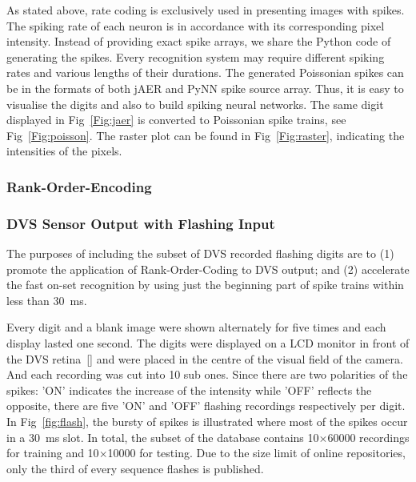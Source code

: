 	As stated above, rate coding is exclusively used in presenting images with spikes.
	The spiking rate of each neuron is in accordance with its corresponding pixel intensity.
	Instead of providing exact spike arrays, we share the Python code of generating the spikes.
	Every recognition system may require different spiking rates and various lengths of their durations.
	The generated Poissonian spikes can be in the formats of both jAER and PyNN spike source array.
	Thus, it is easy to visualise the digits and also to build spiking neural networks.
	The same digit displayed in Fig~\ref{Fig:jaer} is converted to Poissonian spike trains, see Fig~\ref{Fig:poisson}.
	The raster plot can be found in Fig~\ref{Fig:raster}, indicating the intensities of the pixels.

	
	\subsubsection{Rank-Order-Encoding}
  
	\subsubsection{DVS Sensor Output with Flashing Input}
	\label{subsec_flash}
	The purposes of including the subset of DVS recorded flashing digits are to (1) promote the application of Rank-Order-Coding to DVS output; and (2) accelerate the fast on-set recognition by using just the beginning part of spike trains within less than 30~ms.
	
	Every digit and a blank image were shown alternately for five times and each display lasted one second.
	The digits were displayed on a LCD monitor in front of the DVS retina~[\cite{serrano-gotarredona_128_2013}] and were placed in the centre of the visual field of the camera.
	And each recording was cut into 10 sub ones.
	Since there are two polarities of the spikes: 'ON' indicates the increase of the intensity while 'OFF' reflects the opposite, there are five 'ON' and 'OFF' flashing recordings respectively per digit.
	In Fig~\ref{fig:flash}, the bursty of spikes is illustrated where most of the spikes occur in a 30~ms slot. 
	In total, the subset of the database contains 10$\times$60000 recordings for training and 10$\times$10000 for testing.
	Due to the size limit of online repositories, only the third of every sequence flashes is published.


